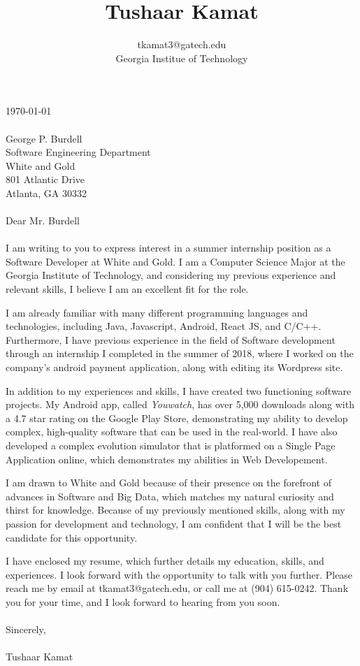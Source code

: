 \documentclass[11pt]{article}
\title{Tushaar Kamat \vspace{-1em}}
\author{\normalfont \normalsize tkamat3@gatech.edu\vspace{-.5em}\\ \normalfont \normalsize Georgia Institue of Technology}
\date{}
\begin{document}
\maketitle
\vspace{-1.5em}
\noindent \today\\
\\
George P. Burdell\\
Software Engineering Department\\
White and Gold\\
801 Atlantic Drive\\ 
Atlanta, GA 30332\\
\\
Dear Mr. Burdell\\
\\
\noindent I am writing to you to express interest in a summer internship
position as a Software Developer at White and Gold. I am a Computer Science
Major at the Georgia Institute of Technology, and considering my previous
experience and relevant skills, I believe I am an excellent fit for the role.

\noindent I am already familiar with many different programming languages and
technologies, including Java, Javascript, Android, React JS, and C/C++.
Furthermore, I have previous experience in the field of Software development
through an internship I completed in the summer of 2018, where I worked on the
company's android payment application, along with editing its Wordpress site.

\noindent In addition to my experiences and skills, I have created two functioning
software projects. My Android app, called \textit{Youwatch}, has over 5,000
downloads along with a 4.7 star rating on the Google Play Store, demonstrating
my ability to develop complex, high-quality software that can be used in the
real-world. I have also developed a complex evolution simulator that is
platformed on a Single Page Application online, which demonstrates my abilities
in Web Developement.

\noindent I am drawn to White and Gold because of their presence on the forefront of
advances in Software and Big Data, which matches my natural curiosity and thirst
for knowledge. Because of my previously mentioned skills, along with my passion
for development and technology, I am confident that I will be the best candidate
for this opportunity.

I have enclosed my resume, which further details my education, skills, and
experiences. I look forward with the opportunity to talk with you further.
Please reach me by email at tkamat3@gatech.edu, or call me at (904) 615-0242.
Thank you for your time, and I look forward to hearing from you soon.
\\
\\
Sincerely,
\\
\\
Tushaar Kamat
\end{document}
